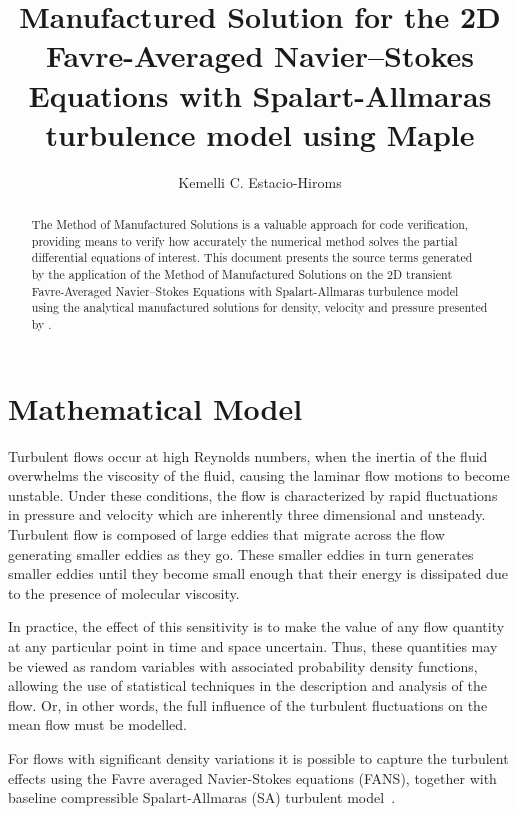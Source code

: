 \documentclass[10pt]{article}
\title{Manufactured Solution for the 2D Favre-Averaged Navier--Stokes Equations with Spalart-Allmaras turbulence model using Maple}
\author{Kemelli C. Estacio-Hiroms}
\begin{document}
\maketitle

\begin{abstract}
The Method of Manufactured Solutions is a valuable approach for code verification, providing means to verify how accurately the numerical method solves the partial differential equations of interest.
This document presents the source terms generated by the application of the Method of Manufactured Solutions on the 2D transient Favre-Averaged Navier--Stokes Equations with Spalart-Allmaras turbulence model using the analytical manufactured solutions for density, velocity and pressure presented by \citet{Roy2002}.
\end{abstract}





\section{Mathematical Model}

Turbulent flows occur at high Reynolds numbers, when the inertia of the fluid overwhelms the viscosity of the fluid, causing the laminar flow motions to become unstable. Under these conditions, the flow is characterized by rapid fluctuations in pressure and velocity which are inherently three dimensional and unsteady. Turbulent flow is composed of large eddies that migrate across the flow generating smaller eddies as they go. These smaller eddies in turn generates smaller eddies until they become small enough that their energy is dissipated due to the presence of molecular viscosity.

In practice, the effect of this sensitivity
is to make the value of any flow quantity at any particular point in
time and space uncertain.  Thus, these quantities may be viewed as
random variables with associated probability density functions,
allowing the use of statistical techniques in the description and
analysis of the flow. Or, in other words, the full influence of the turbulent fluctuations on the mean flow must be modelled.

For flows with significant density variations it is possible to  capture the turbulent effects using the Favre averaged Navier-Stokes equations (FANS), together with baseline compressible Spalart-Allmaras (SA) turbulent model~\citep{Oliver2010}.
\end{document}
